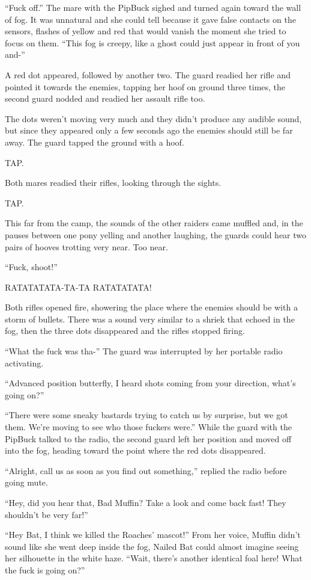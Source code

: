 ``Fuck off.'' The mare with the PipBuck sighed and turned again toward the wall of fog. It was unnatural and she could tell because it gave false contacts on the sensors, flashes of yellow and red that would vanish the moment she tried to focus on them. ``This fog is creepy, like a ghost could just appear in front of you and-''

A red dot appeared, followed by another two. The guard readied her rifle and pointed it towards the enemies, tapping her hoof on ground three times, the second guard nodded and readied her assault rifle too.

The dots weren't moving very much and they didn't produce any audible sound, but since they appeared only a few seconds ago the enemies should still be far away. The guard tapped the ground with a hoof.

TAP.

Both mares readied their rifles, looking through the sights.

TAP.

This far from the camp, the sounds of the other raiders came muffled and, in the pauses between one pony yelling and another laughing, the guards could hear two pairs of hooves trotting very near. Too near.

``Fuck, shoot!''

RATATATATA-TA-TA RATATATATA!

Both rifles opened fire, showering the place where the enemies should be with a storm of bullets. There was a sound very similar to a shriek that echoed in the fog, then the three dots disappeared and the rifles stopped firing.

``What the fuck was tha-'' The guard was interrupted by her portable radio activating.

``Advanced position butterfly, I heard shots coming from your direction, what's going on?''

``There were some sneaky bastards trying to catch us by surprise, but we got them. We're moving to see who those fuckers were.'' While the guard with the PipBuck talked to the radio, the second guard left her position and moved off into the fog, heading toward the point where the red dots disappeared.

``Alright, call us as soon as you find out something,'' replied the radio before going mute.

``Hey, did you hear that, Bad Muffin? Take a look and come back fast! They shouldn't be very far!''

``Hey Bat, I think we killed the Roaches' mascot!'' From her voice, Muffin didn't sound like she went deep inside the fog, Nailed Bat could almost imagine seeing her silhouette in the white haze. ``Wait, there's another identical foal here! What the fuck is going on?''

